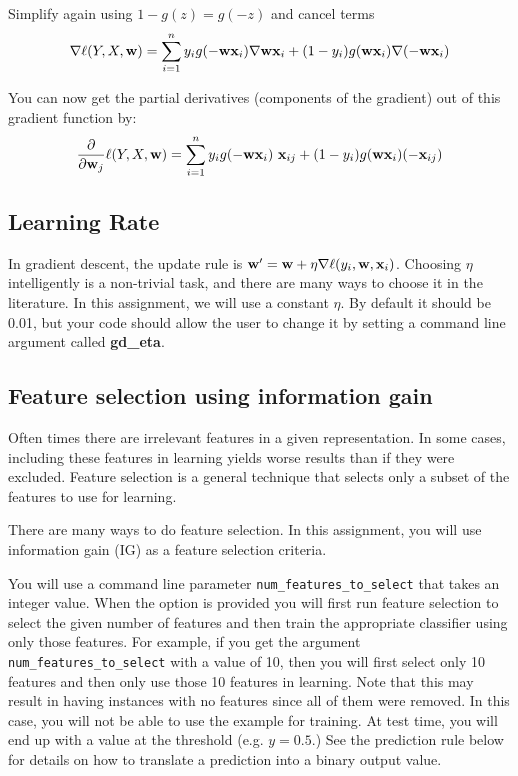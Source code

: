 \documentclass[11pt]{article}
\newcommand{\vw}{{\bf w}}
\newcommand{\vxi}{{\bf x}_i}
\newcommand{\vxij}{{\bf x}_{ij}}
\begin{document}
Simplify again using $1-g(z) = g(-z)$ and cancel terms
\begin{equation}
\nabla \ell(Y,X,\vw) = \sum_{i=1}^n{
	y_i g(-\vw \vxi) \nabla \vw \vxi
	+ (1-y_i) g(\vw \vxi) \nabla (-\vw \vxi)
}
\end{equation}

You can now get the partial derivatives (components of the gradient) out of this gradient function by:
\begin{equation}
\frac{\partial}{\partial \vw_j} \ell(Y,X,\vw) = \sum_{i=1}^n{
	y_i g(-\vw \vxi) \ \vxij
	+ (1-y_i) g(\vw \vxi) (-\vxij)
}
\end{equation}

\subsection{Learning Rate}
In gradient descent, the update rule is $\vw' = \vw + \eta \nabla \ell(y_i, \vw, \vxi)$. Choosing $\eta$ intelligently is a non-trivial task, and there are many ways to choose it in the literature. In this assignment, we will use a constant $\eta$. By default it should be 0.01, but your code should allow the user to change it by setting a command line argument called \textbf{gd\_eta}.



\subsection{Feature selection using information gain}
Often times there are irrelevant features in a given representation. In some cases, including these features in learning yields worse results than if they were excluded. Feature selection is a general technique that selects only a subset of the features to use for learning.

There are many ways to do feature selection. In this assignment, you will use information gain (IG) as a feature selection criteria.

You will use a command line parameter {\tt num\_features\_to\_select} that takes an integer value. When the option is provided you will first run feature selection to select the given number of features and then train the appropriate classifier using only those features. For example, if you get the argument {\tt num\_features\_to\_select} with a value of 10, then you will first select only 10 features and then only use those 10 features in learning. Note that this may result in having instances with no features since all of them were removed. In this case, you will not be able to use the example for training. At test time, you will end up with a value at the threshold (e.g. $y=0.5$.) See the prediction rule below for details on how to translate a prediction into a binary output value.
\end{document}
